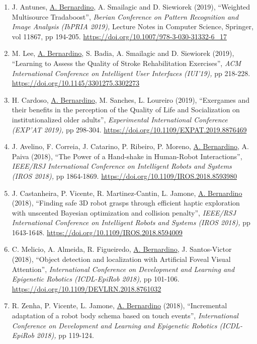 \documentclass[
]{article}
\begin{document}
\begin{enumerate}
{  2019),} pp 48-53. \url{https://doi.org/10.1109/DEVLRN.2019.8850710}~
\item
  J. Antunes, \ul{A. Bernardino}, A. Smailagic and D. Siewiorek (2019),
  ``Weighted Multisource Tradaboost'', \emph{Iberian Conference on
  Pattern Recognition and Image Analysis (IbPRIA 2019),} Lecture Notes
  in Computer Science, Springer, vol 11867, pp 194-205.
  \url{https://doi.org/10.1007/978-3-030-31332-6_17}~
\item
  M. Lee, \ul{A. Bernardino}, S. Badia, A. Smailagic and D. Siewiorek
  (2019), ``Learning to Assess the Quality of Stroke Rehabilitation
  Exercises'', \emph{ACM International Conference on Intelligent User
  Interfaces (IUI'19),} pp 218-228.
  \url{https://doi.org/10.1145/3301275.3302273}~
\item
  H. Cardoso, \ul{A. Bernardino}, M. Sanches, L. Loureiro (2019),
  ``Exergames and their benefits in the perception of the Quality of
  Life and Socialization on institutionalized older adults'',
  \emph{Experimental International Conference (EXP'AT 2019),} pp
  298-304. \url{https://doi.org/10.1109/EXPAT.2019.8876469}~
\item
  J. Avelino, F. Correia, J. Catarino, P. Ribeiro, P. Moreno, \ul{A.
  Bernardino}, A. Paiva (2018), ``The Power of a Hand-shake in
  Human-Robot Interactions'', \emph{IEEE/RSJ International Conference on
  Intelligent Robots and Systems (IROS 2018),} pp 1864-1869.
  \url{https://doi.org/10.1109/IROS.2018.8593980}~
\item
  J. Castanheira, P. Vicente, R. Martinez-Cantin, L. Jamone, \ul{A.
  Bernardino} (2018), ``Finding safe 3D robot grasps through efficient
  haptic exploration with unscented Bayesian optimization and collision
  penalty'', \emph{IEEE/RSJ International Conference on Intelligent
  Robots and Systems (IROS 2018),} pp 1643-1648.
  \url{https://doi.org/10.1109/IROS.2018.8594009}~
\item
  C. Melicio, A. Almeida, R. Figueiredo, \ul{A. Bernardino}, J.
  Santos-Victor (2018), ``Object detection and localization with
  Artificial Foveal Visual Attention'', \emph{International Conference
  on Development and Learning and Epigenetic Robotics (ICDL-EpiRob
  2018),} pp 101-106. \url{https://doi.org/10.1109/DEVLRN.2018.8761032}~
\item
  R. Zenha, P. Vicente, L. Jamone, \ul{A. Bernardino} (2018),
  ``Incremental adaptation of a robot body schema based on touch
  events'', \emph{International Conference on Development and Learning
  and Epigenetic Robotics (ICDL-EpiRob 2018),} pp 119-124.

\end{enumerate}
\end{document}
